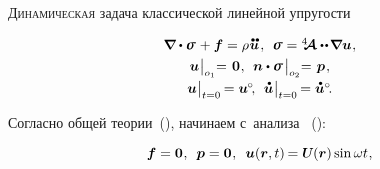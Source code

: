 \begin{otherlanguage}{russian}

\lettrine[lines=2, findent=2pt, nindent=0pt]{Д}{инамическая} задача классической линейной упругости

\nopagebreak\vspace{-0.1em}\begin{equation}\label{classiclinearelasticity:problem}
\begin{array}{c}
\boldnabla \dotp \linearstress \hspace{.15ex} + \bm{f} = \rho \hspace{.1ex} \mathdotdotabove{\bm{u}} \hspace{.2ex} ,
\:\:
\linearstress = \stiffnesstensor \dotdotp \hspace{-0.25ex} \boldnabla {\bm{u}} \hspace{.1ex} ,
\\[.32em]
%
\bm{u} \hspace{.1ex} \bigr|_{o_1} \hspace{-0.64ex} = \hspace{.2ex} \bm{0} \hspace{.1ex},
\:\:
\bm{n} \dotp \linearstress \hspace{0.25ex} \bigr|_{o_2} \hspace{-0.64ex} = \hspace{.2ex} \bm{p} \hspace{.16ex} ,
\\[.4em]
%
\bm{u} \hspace{.1ex} \bigr|_{t=0} \hspace{-0.2ex} = \bm{u}^{\hspace{-0.1ex}\circ} \hspace{-0.4ex},
\:\:
\mathdotabove{\bm{u}} \hspace{.1ex} \bigr|_{t=0} \hspace{-0.2ex} = \mathdotabove{\bm{u}}^{\circ} \hspace{-0.4ex} .
\end{array}
\end{equation}

\vspace{.2em} Согласно общей теории~(), начинаем с~анализа ~():

\nopagebreak\vspace{-0.25em}\begin{equation*}
\bm{f} = \bm{0} \hspace{.1ex} ,
\:\;
\bm{p} = \bm{0} \hspace{.1ex} ,
\:\;
\bm{u}(\bm{r}, t) \hspace{-0.2ex} = \mathboldU(\bm{r}) \operatorname{sin} \omega t
\hspace{.1ex} ,
\end{equation*}


\end{otherlanguage}
